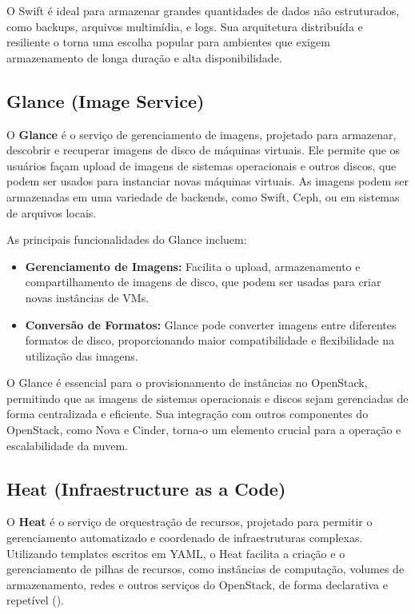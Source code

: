 O Swift é ideal para armazenar grandes quantidades de dados não estruturados, como backups, arquivos multimídia, e logs. Sua arquitetura distribuída e resiliente o torna uma escolha popular para ambientes que exigem armazenamento de longa duração e alta disponibilidade.

\subsection{Glance (Image Service)}

O \textbf{Glance} é o serviço de gerenciamento de imagens, projetado para armazenar, descobrir e recuperar imagens de disco de máquinas virtuais. Ele permite que os usuários façam upload de imagens de sistemas operacionais e outros discos, que podem ser usados para instanciar novas máquinas virtuais. As imagens podem ser armazenadas em uma variedade de backends, como Swift, Ceph, ou em sistemas de arquivos locais.

As principais funcionalidades do Glance incluem:

\begin{itemize}
    \item \textbf{Gerenciamento de Imagens:} Facilita o upload, armazenamento e compartilhamento de imagens de disco, que podem ser usadas para criar novas instâncias de VMs.
    \item \textbf{Conversão de Formatos:} Glance pode converter imagens entre diferentes formatos de disco, proporcionando maior compatibilidade e flexibilidade na utilização das imagens.
\end{itemize}

O Glance é essencial para o provisionamento de instâncias no OpenStack, permitindo que as imagens de sistemas operacionais e discos sejam gerenciadas de forma centralizada e eficiente. Sua integração com outros componentes do OpenStack, como Nova e Cinder, torna-o um elemento crucial para a operação e escalabilidade da nuvem.

\subsection{Heat (Infraestructure as a Code)}

O \textbf{Heat} é o serviço de orquestração de recursos, projetado para permitir o gerenciamento automatizado e coordenado de infraestruturas complexas. Utilizando templates escritos em YAML, o Heat facilita a criação e o gerenciamento de pilhas de recursos, como instâncias de computação, volumes de armazenamento, redes e outros serviços do OpenStack, de forma declarativa e repetível (\cite{OpenStackHeat}).

